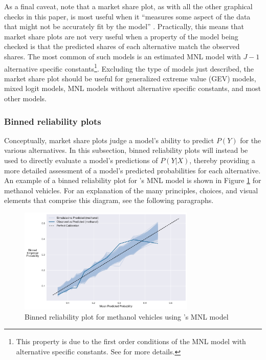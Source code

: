 \documentclass[preprint]{elsarticle}
\begin{document}
As a final caveat, note that a market share plot, as with all the other graphical checks in this paper, is most useful when it ``measures some aspect of the data that might not be accurately fit by the model'' \citep[p.191]{gelman_1996_model}. Practically, this means that market share plots are not very useful when a property of the model being checked is that the predicted shares of each alternative match the observed shares. The most common of such models is an estimated MNL model with $J - 1$ alternative specific constants\footnote{This property is due to the first order conditions of the MNL model with alternative specific constants. See \citet[p.62]{train_discrete_2009} for more details.}. Excluding the type of models just described, the market share plot should be useful for generalized extreme value (GEV) models, mixed logit models, MNL models without alternative specific constants, and most other models.

\subsubsection{Binned reliability plots}
\label{sec:case1-part1-reliability-plots}
Conceptually, market share plots judge a model's ability to predict $P \left( Y \right)$ for the various alternatives. In this subsection, binned reliability plots will instead be used to directly evaluate a model's predictions of $P \left( Y | X \right)$, thereby providing a more detailed assessment of a model's predicted probabilities for each alternative. An example of a binned reliability plot for \citeauthor{brownstone_forecasting_1998}'s MNL model is shown in Figure \ref{fig:orig-mnl-methanol-reliability} for methanol vehicles. For an explanation of the many principles, choices, and visual elements that comprise this diagram, see the following paragraphs.

\begin{figure}
\centering
\includegraphics[width=0.75\textwidth]{reliability-plot-vehicle-choice-mnl-methanol-point}
\caption{Binned reliability plot for methanol vehicles using \citeauthor{brownstone_forecasting_1998}'s MNL model}
\label{fig:orig-mnl-methanol-reliability}
\end{figure}
\end{document}
